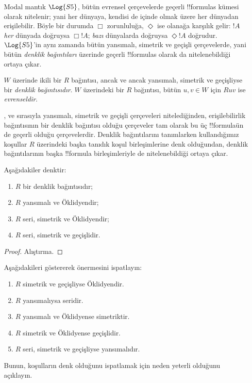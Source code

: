 \documentclass[../../../include/open-logic-section]{subfiles}
\begin{document}


Modal mantık $\Log{S5}$, bütün evrensel çerçevelerde geçerli !!{formula}s
kümesi olarak nitelenir; yani her dünyaya, kendisi de içinde olmak üzere her
dünyadan erişilebilir. Böyle bir durumda $\Box$ zorunluluğa, $\Diamond$ ise
olanağa karşılık gelir: $!A$ \emph{her} dünyada doğruysa $\Box !A$;
\emph{bazı} dünyalarda doğruysa $\Diamond !A$ doğrudur. $\Log{S5}$'in
aynı zamanda bütün yansımalı, simetrik ve geçişli çerçevelerde, yani bütün
\emph{denklik bağıntıları} üzerinde geçerli !!{formula}s olarak da
nitelenebildiği ortaya çıkar.

\begin{defn}
  $W$ üzerinde ikili bir $R$ bağıntısı, ancak ve ancak yansımalı, simetrik ve
  geçişliyse bir \emph{denklik bağıntısıdır}. $W$ üzerindeki bir $R$
  bağıntısı, bütün $u,v\in W$ için $Ruv$ ise \emph{evrenseldir}.
\end{defn}

,  ve  sırasıyla yansımalı, simetrik ve geçişli
çerçeveleri nitelediğinden, erişilebilirlik bağıntısının bir denklik
bağıntısı olduğu çerçeveler tam olarak bu üç !!{formula}{}ün de geçerli
olduğu çerçevelerdir. Denklik bağıntılarını tanımlarken kullandığımız
koşullar $R$ üzerindeki başka tanıdık koşul birleşimlerine denk olduğundan,
denklik bağıntılarının başka !!{formula} birleşimleriyle de nitelenebildiği
ortaya çıkar.

\begin{prop}
  Aşağıdakiler denktir:
  \begin{enumerate}
  \item $R$ bir denklik bağıntısıdır;
  \item $R$ yansımalı ve Öklidyendir;
  \item $R$ seri, simetrik ve Öklidyendir;
  \item $R$ seri, simetrik ve geçişlidir.
  \end{enumerate}
\end{prop}

\begin{proof}
  Alıştırma.
\end{proof}

\begin{prob}
  Aşağıdakileri göstererek 
  önermesini ispatlayın:
  \begin{enumerate}
  \item $R$ simetrik ve geçişliyse Öklidyendir.
  \item $R$ yansımalıysa seridir.
  \item $R$ yansımalı ve Öklidyense simetriktir.
  \item $R$ simetrik ve Öklidyense geçişlidir.
  \item $R$ seri, simetrik ve geçişliyse yansımalıdır.
  \end{enumerate}
  Bunun, koşulların denk olduğunu ispatlamak için neden yeterli olduğunu
  açıklayın.
\end{prob}
\end{document}
